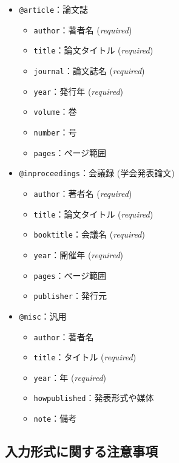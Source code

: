 \documentclass{ltjsarticle}
\begin{document}
\begin{itemize}
    \item \texttt{@article}：論文誌
    \begin{itemize}
        \item \texttt{author}：著者名 (\textit{required})
        \item \texttt{title}：論文タイトル (\textit{required})
        \item \texttt{journal}：論文誌名 (\textit{required})
        \item \texttt{year}：発行年 (\textit{required})
        \item \texttt{volume}：巻
        \item \texttt{number}：号
        \item \texttt{pages}：ページ範囲
    \end{itemize}

    \item \texttt{@inproceedings}：会議録 (学会発表論文)
    \begin{itemize}
        \item \texttt{author}：著者名 (\textit{required})
        \item \texttt{title}：論文タイトル (\textit{required})
        \item \texttt{booktitle}：会議名 (\textit{required})
        \item \texttt{year}：開催年 (\textit{required})
        \item \texttt{pages}：ページ範囲
        \item \texttt{publisher}：発行元
    \end{itemize}

    \item \texttt{@misc}：汎用
    \begin{itemize}
        \item \texttt{author}：著者名
        \item \texttt{title}：タイトル (\textit{required})
        \item \texttt{year}：年 (\textit{required})
        \item \texttt{howpublished}：発表形式や媒体
        \item \texttt{note}：備考
    \end{itemize}
\end{itemize}
\subsection{入力形式に関する注意事項}
\end{document}
